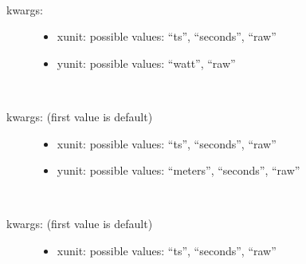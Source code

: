 \documentclass[letterpaper,10pt,openany,oneside,english]{sphinxmanual}
\begin{document}
\begin{fulllineitems}
\begin{fulllineitems}
\begin{description}
\begin{itemize}
\end{itemize}

\end{description}

\end{fulllineitems}


\begin{fulllineitems}
\label{\detokenize{plots:plots.SimplePlotter.csr_intensity}}~\begin{description}
\item[{kwargs:  }] \leavevmode\begin{itemize}
\item {} 
xunit: possible values: “ts”, “seconds”, “raw”

\item {} 
yunit: possible values: “watt”, “raw”

\end{itemize}

\end{description}

\end{fulllineitems}


\begin{fulllineitems}
\label{\detokenize{plots:plots.SimplePlotter.bunch_position}}~\begin{description}
\item[{kwargs: (first value is default)  }] \leavevmode\begin{itemize}
\item {} 
xunit: possible values: “ts”, “seconds”, “raw”

\item {} 
yunit: possible values: “meters”, “seconds”, “raw”

\end{itemize}

\end{description}

\end{fulllineitems}


\begin{fulllineitems}
\label{\detokenize{plots:plots.SimplePlotter.bunch_population}}~\begin{description}
\item[{kwargs: (first value is default)  }] \leavevmode\begin{itemize}
\item {} 
xunit: possible values: “ts”, “seconds”, “raw”


\end{itemize}
\end{description}
\end{fulllineitems}
\end{fulllineitems}
\end{document}
